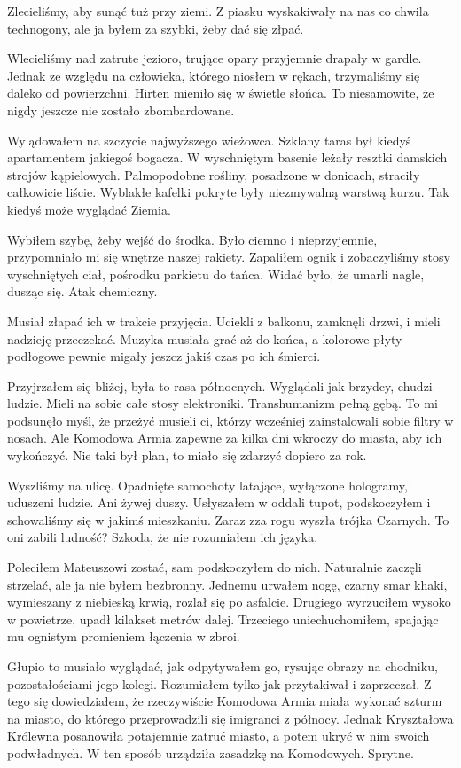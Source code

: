 Zlecieliśmy, aby sunąć tuż przy ziemi.
Z piasku wyskakiwały na nas co chwila technogony, ale ja byłem za szybki, żeby dać się złpać.

Wlecieliśmy nad zatrute jezioro, trujące opary przyjemnie drapały w gardle.
Jednak ze względu na człowieka, którego niosłem w rękach, trzymaliśmy się daleko od powierzchni.
Hirten mieniło się w świetle słońca. 
To niesamowite, że nigdy jeszcze nie zostało zbombardowane. 

Wylądowałem na szczycie najwyższego wieżowca. 
Szklany taras był kiedyś apartamentem jakiegoś bogacza. W wyschniętym basenie leżały resztki damskich strojów kąpielowych.
Palmopodobne rośliny, posadzone w donicach, straciły całkowicie liście.
Wyblakłe kafelki pokryte były niezmywalną warstwą kurzu.
Tak kiedyś może wyglądać Ziemia.

Wybiłem szybę, żeby wejść do środka.
Było ciemno i nieprzyjemnie, przypomniało mi się wnętrze naszej rakiety.
Zapaliłem ognik i zobaczyliśmy stosy wyschniętych ciał, pośrodku parkietu do tańca.
Widać było, że umarli nagle, dusząc się. Atak chemiczny.

Musiał złapać ich w trakcie przyjęcia.
Uciekli z balkonu, zamknęli drzwi, i mieli nadzieję przeczekać.
Muzyka musiała grać aż do końca, a kolorowe płyty podłogowe pewnie migały jeszcz jakiś czas po ich śmierci.

Przyjrzałem się bliżej, była to rasa północnych.
Wyglądali jak brzydcy, chudzi ludzie.
Mieli na sobie całe stosy elektroniki.
Transhumanizm pełną gębą.
To mi podsunęło myśl, że przeżyć musieli ci, którzy wcześniej zainstalowali sobie filtry w nosach.
Ale Komodowa Armia zapewne za kilka dni wkroczy do miasta, aby ich wykończyć.
Nie taki był plan, to miało się zdarzyć dopiero za rok.

Wyszliśmy na ulicę. Opadnięte samochoty latające, wyłączone hologramy, uduszeni ludzie.
Ani żywej duszy. Usłyszałem w oddali tupot, podskoczyłem i schowaliśmy się w jakimś mieszkaniu.
Zaraz zza rogu wyszła trójka Czarnych. To oni zabili ludność?
Szkoda, że nie rozumiałem ich języka.

Poleciłem Mateuszowi zostać, sam podskoczyłem do nich.
Naturalnie zaczęli strzelać, ale ja nie byłem bezbronny.
Jednemu urwałem nogę, czarny smar khaki, wymieszany z niebieską krwią, rozlał się po asfalcie.
Drugiego wyrzuciłem wysoko w powietrze, upadł kilakset metrów dalej. 
Trzeciego uniechuchomiłem, spajając mu ognistym promieniem łączenia w zbroi.

Głupio to musiało wyglądać, jak odpytywałem go, rysując obrazy na chodniku, pozostałościami jego kolegi.
Rozumiałem tylko jak przytakiwał i zaprzeczał.
Z tego się dowiedziałem, że rzeczywiście Komodowa Armia miała wykonać szturm na miasto, do którego przeprowadzili się imigranci z północy.
Jednak Kryształowa Królewna posanowiła potajemnie zatruć miasto, a potem ukryć w nim swoich podwładnych.
W ten sposób urządziła zasadzkę na Komodowych. Sprytne.

